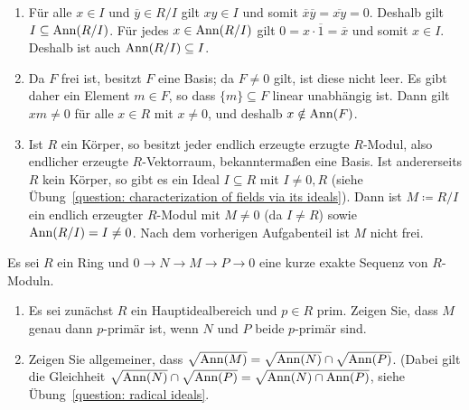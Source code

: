 \begin{solution}
  \begin{enumerate}
    \item
      Für alle $x \in I$ und $\overline{y} \in R/I$ gilt $xy \in I$ und somit $\overline{x} \overline{y} = \overline{xy} = 0$.
      Deshalb gilt $I \subseteq \operatorname{Ann}(R/I)$.
      Für jedes $x \in \operatorname{Ann}(R/I)$ gilt $0 = x \cdot \overline{1} = \overline{x}$ und somit $x \in I$.
      Deshalb ist auch $\operatorname{Ann}(R/I) \subseteq I$.
    \item
      Da $F$ frei ist, besitzt $F$ eine Basis; da $F \neq 0$ gilt, ist diese nicht leer.
      Es gibt daher ein Element $m \in F$, so dass $\{m\} \subseteq F$ linear unabhängig ist.
      Dann gilt $xm \neq 0$ für alle $x \in R$ mit $x \neq 0$, und deshalb $x \notin \operatorname{Ann}(F)$.
    \item
      Ist $R$ ein Körper, so besitzt jeder endlich erzeugte erzugte $R$-Modul, also endlicher erzeugte $R$-Vektorraum, bekanntermaßen eine Basis.
      Ist andererseits $R$ kein Körper, so gibt es ein Ideal $I \subseteq R$ mit $I \neq 0, R$ (siehe Übung~\ref{question: characterization of fields via its ideals}).
      Dann ist $M \coloneqq R/I$ ein endlich erzeugter $R$-Modul mit $M \neq 0$ (da $I \neq R$) sowie $\operatorname{Ann}(R/I) = I \neq 0$.
      Nach dem vorherigen Aufgabenteil ist $M$ nicht frei.
  \end{enumerate}
\end{solution}


\begin{question}
  Es sei $R$ ein Ring und $0 \to N \to M \to P \to 0$ eine kurze exakte Sequenz von $R$-Moduln.
  \begin{enumerate}
    \item
      Es sei zunächst $R$ ein Hauptidealbereich und $p \in R$ prim.
      Zeigen Sie, dass $M$ genau dann $p$-primär ist, wenn $N$ und $P$ beide $p$-primär sind.
    \item
      Zeigen Sie allgemeiner, dass $\sqrt{\operatorname{Ann}(M)} = \sqrt{\operatorname{Ann}(N)} \cap \sqrt{\operatorname{Ann}(P)}$.
      (Dabei gilt die Gleichheit $\sqrt{\operatorname{Ann}(N)} \cap \sqrt{\operatorname{Ann}(P)} = \sqrt{\operatorname{Ann}(N) \cap \operatorname{Ann}(P)}$, siehe Übung~\ref{question: radical ideals}.
  \end{enumerate}
\end{question}


